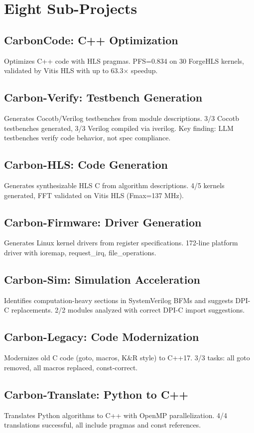 \documentclass[conference]{IEEEtran}
\begin{document}
\section{Eight Sub-Projects}

\subsection{CarbonCode: C++ Optimization}
Optimizes C++ code with HLS pragmas. PFS=0.834 on 30 ForgeHLS
kernels, validated by Vitis HLS with up to 63.3$\times$ speedup.

\subsection{Carbon-Verify: Testbench Generation}
Generates Cocotb/Verilog testbenches from module descriptions.
3/3 Cocotb testbenches generated, 3/3 Verilog compiled via iverilog.
Key finding: LLM testbenches verify code behavior, not spec compliance.

\subsection{Carbon-HLS: Code Generation}
Generates synthesizable HLS C from algorithm descriptions.
4/5 kernels generated, FFT validated on Vitis HLS (Fmax=137 MHz).

\subsection{Carbon-Firmware: Driver Generation}
Generates Linux kernel drivers from register specifications.
172-line platform driver with ioremap, request\_irq, file\_operations.

\subsection{Carbon-Sim: Simulation Acceleration}
Identifies computation-heavy sections in SystemVerilog BFMs and
suggests DPI-C replacements. 2/2 modules analyzed with correct
DPI-C import suggestions.

\subsection{Carbon-Legacy: Code Modernization}
Modernizes old C code (goto, macros, K\&R style) to C++17.
3/3 tasks: all goto removed, all macros replaced, const-correct.

\subsection{Carbon-Translate: Python to C++}
Translates Python algorithms to C++ with OpenMP parallelization.
4/4 translations successful, all include pragmas and const references.
\end{document}
